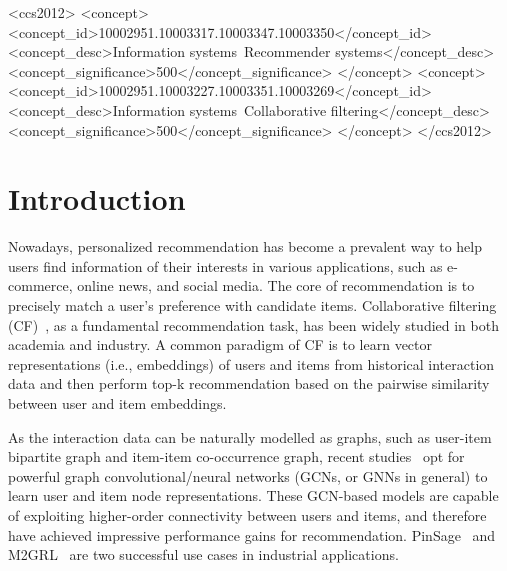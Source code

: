 \documentclass[sigconf,authorversion]{acmart}
\begin{document}
\begin{CCSXML}
<ccs2012>
<concept>
<concept_id>10002951.10003317.10003347.10003350</concept_id>
<concept_desc>Information systems~Recommender systems</concept_desc>
<concept_significance>500</concept_significance>
</concept>
<concept>
<concept_id>10002951.10003227.10003351.10003269</concept_id>
<concept_desc>Information systems~Collaborative filtering</concept_desc>
<concept_significance>500</concept_significance>
</concept>
</ccs2012>
\end{CCSXML}



\maketitle

\section{Introduction}\label{introduction}

Nowadays, personalized recommendation has become a prevalent way to help users find information of their interests in various applications, such as e-commerce, online news, and social media. The core of recommendation is to precisely match a user's preference with candidate items. Collaborative filtering (CF)~\cite{NeuMF}, as a fundamental recommendation task, has been widely studied in both academia and industry. A common paradigm of CF is to learn vector representations (i.e., embeddings) of users and items from historical interaction data and then perform top-k recommendation based on the pairwise similarity between user and item embeddings.




As the interaction data can be naturally modelled as graphs, such as user-item bipartite graph and item-item co-occurrence graph, recent studies~\cite{NGCF,LightGCN,NIA-GCN,DHCF} opt for powerful graph convolutional/neural networks (GCNs, or GNNs in general) to learn user and item node representations. These GCN-based models are capable of exploiting higher-order connectivity between users and items, and therefore have achieved impressive performance gains for recommendation. PinSage~\cite{PinSage} and M2GRL~\cite{M2GRL} are two successful use cases in industrial applications. 
\end{document}
